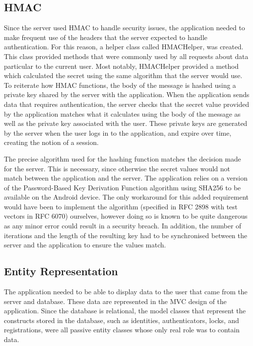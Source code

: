 \documentclass[12pt]{report}
\let\Oldsubsection\subsection
\renewcommand{\subsection}{\FloatBarrier\Oldsubsection}
\begin{document}

\subsection{HMAC} \label{hmac}

Since the server used HMAC to handle security issues, the application needed to make frequent use of the headers that
the server expected to handle authentication. For this reason, a helper class called HMACHelper, was created. This
class provided methods that were commonly used by all requests about data particular to the current user. Most notably,
HMACHelper provided a method which calculated the secret using the same algorithm that the server would use. To
reiterate how HMAC functions, the body of the message is hashed using a private key shared by the server with the
application. When the application sends data that requires authentication, the server checks that the secret value
provided by the application matches what it calculates using the body of the message as well as the private key
associated with the user. These private keys are generated by the server when the user logs in to the application,
and expire over time, creating the notion of a session.

The precise algorithm used for the hashing function matches the decision made for the server. This is necessary, since
otherwise the secret values would not match between the application and the server. The application relies on a version
of the Password-Based Key Derivation Function algorithm using SHA256 to be available on the Android device. The only
workaround for this added requirement would have been to implement the algorithm (specified in RFC 2898 with test
vectors in RFC 6070) ourselves, however doing so is known to be quite dangerous as any minor error could result in a
security breach. In addition, the number of iterations and the length of the resulting key had to be synchronised
between the server and the application to ensure the values match.


\subsection{Entity Representation} \label{entity-representation}

The application needed to be able to display data to the user that came from the server and database. These data are
represented in the MVC design of the application. Since the database is relational, the model classes that represent
the constructs stored in the database, such as identities, authenticators, locks, and registrations, were all passive
entity classes whose only real role was to contain data.
\end{document}
